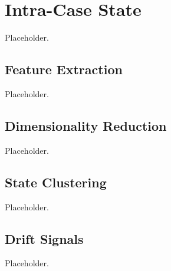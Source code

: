 \chapter{Intra-Case State}
\label{chap:intra_case}

Placeholder.

\section{Feature Extraction}
\label{sec:intra_case:feature_extraction}
Placeholder.

\section{Dimensionality Reduction}
\label{sec:intra_case:reduction}
Placeholder.

\section{State Clustering}
\label{sec:intra_case:state_clustering}
Placeholder.

\section{Drift Signals}
\label{sec:intra_case:drift_signals}
Placeholder.
